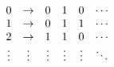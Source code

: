 \documentclass[preview]{standalone}
\begin{document}
\begin{align*}
\begin{array}{c c c c c c}
                0 & \rightarrow & 0 & 1 & 0 & \cdots \\
                1 & \rightarrow & 0 & 1 & 1 & \cdots \\
                2 & \rightarrow & 1 & 1 & 0 & \cdots \\
                \vdots & \vdots & \vdots & \vdots & \vdots & \ddots 
            \end{array}
\end{align*}
\end{document}
